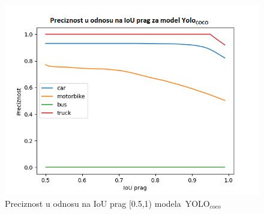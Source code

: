 \documentclass[12pt,oneside]{memoir}
\newcommand{\yolo}{\ensuremath{\,\textrm{YOLO}}}
\begin{document}
\begin{figure}[!ht]
    \centering
    \includegraphics[width=1\textwidth]{matfmaster/glava4/precision_vs_iou_threshold_yolo4.png}
    \caption{Preciznost u odnosu na IoU prag [0.5,1) modela $\yolo_{coco}$}
    \label{fig:YOLO4_COCO_prc}
\end{figure}
\end{document}

